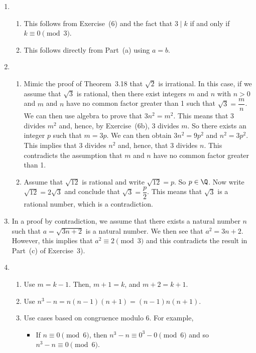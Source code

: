 \begin{enumerate}
\item \begin{enumerate}
\item This follows from Exercise~(6) and the fact that  $3 \mid k$ if and only if  
$k \equiv 0 \pmod 3$.
\item This follows directly from Part~(a) using $a = b$.
\end{enumerate}


\item \begin{enumerate}
\item Mimic the proof of Theorem~3.18 that $\sqrt{2}$ is irrational.  In this case, if we assume that $\sqrt{3}$ is rational, then there exist integers $m$ and $n$ with $n > 0$ and $m$ and $n$ have no common factor greater than 1 such that $\sqrt{3} = \dfrac{m}{n}$.  We can then use algebra to prove that $3n^2 = m^2$.  This means that 3 divides $m^2$ and, hence, by Exercise~(6b), 3 divides $m$.  So there exists an integer $p$ such that $m = 3p$.  We can then obtain $3n^2 = 9p^2$ and $n^2 = 3p^2$.  This implies that 3 divides $n^2$ and, hence, that 3 divides $n$.  This contradicts the assumption that $m$ and $n$ have no common factor greater than 1.

\item Assume that $\sqrt{12}$ is rational and write $\sqrt{12} = p$.  So $p \in \Q$.  Now write 
$\sqrt{12} = 2 \sqrt{3}$ and conclude that $\sqrt{3} = \dfrac{p}{2}$.  This means that $\sqrt{3}$ is a rational number, which is a contradiction.
\end{enumerate}


\item In a proof by contradiction, we assume that there exists a natural number $n$ such that 
$a = \sqrt{3n + 2}$ is a natural number.  We then see that $a^2 = 3n + 2$.  However, this implies that $a^2 \equiv 2 \pmod 3$ and this contradicts the result in Part~(c) of Exercise~3).



\item \begin{enumerate}
\item Use $m = k - 1$.  Then, $m +1 = k$, and $m + 2 = k + 1$.

\item Use $n^3 - n = n \left( n - 1 \right) \left( n + 1 \right) = 
\left( n - 1 \right) n \left( n + 1 \right)$.

\item Use cases based on congruence modulo 6.  For example,
\begin{itemize}
\item If $n \equiv 0 \pmod 6$, then $n^3 - n \equiv 0^3 - 0 \pmod 6$ and so 
$n^3 - n \equiv 0 \pmod 6$.


\end{itemize}
\end{enumerate}
\end{enumerate}
